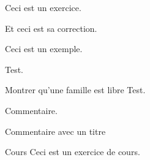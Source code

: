     \begin{latexcode}
        \begin{exercise}{}{}
            Ceci est un exercice.
        \end{exercise}
    \end{latexcode}

    \begin{latexcode}
        \begin{correction}
            Et ceci est sa correction.
        \end{correction}
    \end{latexcode}

    \begin{latexcode}
        \begin{example}{}{}
            Ceci est un exemple.
        \end{example}
    \end{latexcode}

    \begin{latexcode}
        \begin{remark}{}{}
            Test.
        \end{remark}
    \end{latexcode}

    \begin{latexcode}
        \begin{method}{Montrer qu'une famille est libre}{}
            Test.
        \end{method}
    \end{latexcode}

    \begin{latexcode}
        \begin{note}
            Commentaire.
        \end{note}
    \end{latexcode}

    \begin{latexcode}
        \begin{note}[Note]
            Commentaire avec un titre
        \end{note}
    \end{latexcode}

    \begin{latexcode}
        \begin{subject}{}{}
            \begin{subjectexercise}{Cours}{}
                Ceci est un exercice de cours.
            \end{subjectexercise}
        \end{subject}
    \end{latexcode}
